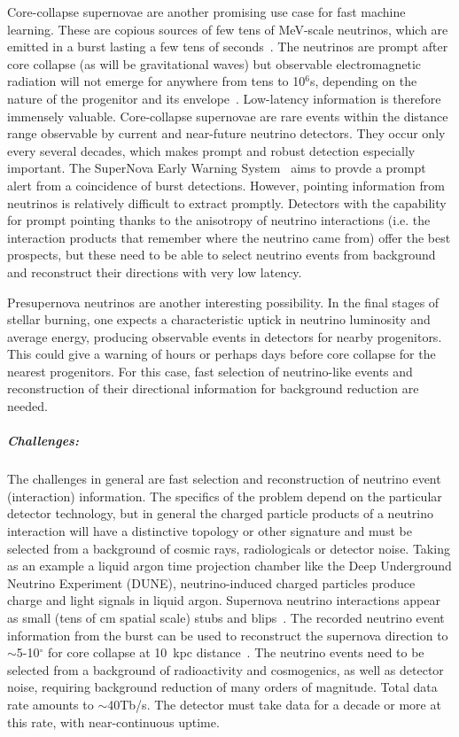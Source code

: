 Core-collapse supernovae are another promising use case for fast machine learning.  
These are copious sources of few tens of MeV-scale neutrinos, which are emitted in a burst lasting a few tens of seconds~\cite{Scholberg:2012id,Mirizzi:2015eza}. 
The neutrinos are prompt after core collapse (as will be gravitational waves) but observable electromagnetic radiation will not emerge for anywhere from tens to 10$^6$\unit{s}, depending on the nature of the progenitor and its envelope~\cite{Kistler:2012as}.  
Low-latency information is therefore immensely valuable.  
Core-collapse supernovae are rare events within the distance range observable by current and near-future neutrino detectors.  
They occur only every several decades, which makes prompt and robust detection especially important.  
The SuperNova Early Warning System~\cite{Antonioli:2004zb,Kharusi:2020ovw} aims to provde a prompt alert from a coincidence of burst detections.  
However, pointing information from neutrinos is relatively difficult to extract promptly.  Detectors with the capability for prompt pointing thanks to the anisotropy of neutrino interactions (i.e. the interaction products that remember where the neutrino came from) offer the best prospects, but these need to be able to select neutrino events from background and reconstruct their directions with very low latency.

Presupernova neutrinos are another interesting possibility. In the final stages of stellar burning, one expects a characteristic uptick in neutrino luminosity and average energy, producing observable events in detectors for nearby progenitors.  
This could give a warning of hours or perhaps days before core collapse for the nearest progenitors. For this case, fast selection of neutrino-like events and reconstruction of their directional information for background reduction are needed.


\subparagraph*{Challenges:}

  The challenges in general are fast selection and reconstruction of neutrino event (interaction) information.  
  The specifics of the problem depend on the particular detector technology, but in general the charged particle products of a neutrino interaction will have a distinctive topology or other signature and must be selected from a background of cosmic rays, radiologicals or detector noise.
  Taking as an example a liquid argon time projection chamber like the Deep Underground Neutrino Experiment (DUNE), neutrino-induced charged particles produce charge and light signals in liquid argon.   
  Supernova neutrino interactions appear as small (tens of cm spatial scale) stubs and blips~\cite{Abi:2020lpk, Abi:2020evt}. 
  The recorded neutrino event information from the burst can be used to reconstruct the supernova direction to $\sim$5-10$^\circ$ for core collapse at 10~kpc distance~\cite{ajpointingtalk,Abi:2020evt}. 
  The neutrino events need to be selected from a background of radioactivity and cosmogenics, as well as detector noise, requiring background reduction of many orders of magnitude.  
  Total data rate amounts to $\sim$40\unit{Tb/s}.  
  The detector must take data for a decade or more at this rate, with near-continuous uptime. 
  
